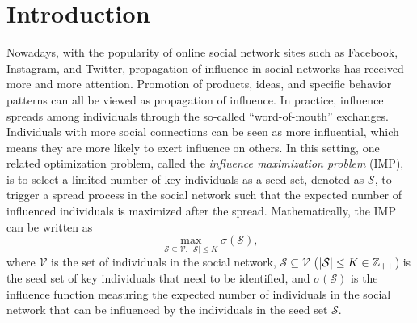 \documentclass[a4paper,10pt]{article}
\theoremstyle{plain}
\newcommand{\rev}[1]{{\color{black}#1}}
\begin{document}
	\section{Introduction}
	\label{sect:introduction}
	Nowadays, with the popularity of online social network sites such as Facebook, Instagram, and Twitter, 
	propagation of influence in social networks has received more and more attention.
	Promotion of products, ideas, and specific behavior patterns can all be viewed as propagation of influence.
	In practice, influence spreads among individuals through the so-called ``word-of-mouth'' exchanges.
	{Individuals with more social connections can be seen as more influential, 
		which means they are more likely to exert influence on others.}
	In this setting, one related optimization problem, called the \emph{influence maximization problem} (IMP), 
	is to select a limited number of key individuals as a seed set, denoted as $\mathcal{S}$, to trigger a spread process in the social network 
	such that the expected number of influenced individuals is maximized after the spread.
	Mathematically, the IMP can be written as
	\begin{equation}\label{originalIMP}
		\max_{\mathcal{S}\subseteq\mathcal{V},~|\mathcal{S}|\leq K} \sigma(\mathcal{S}),
	\end{equation}
	where $\mathcal{V}$ is the set of individuals in the social network, $\mathcal{S}\subseteq\mathcal{V}$ ($|\mathcal{S}|\leq K\in \rev{\mathbb{Z}_{++}}$) is the seed set of key individuals that need to be identified, and $\sigma(\mathcal{S})$ is the influence function 
	measuring the expected number of individuals in the social network that can be influenced by the individuals in the seed set $\mathcal{S}$.
	
\end{document}
